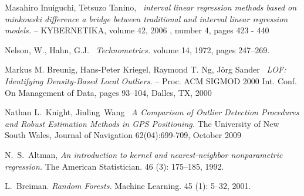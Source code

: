 \documentclass[a4paper,14pt]{extarticle}
\begin{document}
\begin{thebibliography}{8}
    Masahiro Inuiguchi, Tetsuzo Tanino,~
    \textit{interval linear regression methods based on minkowski difference a bridge between traditional and interval linear regression models.} --
    KYBERNETIKA, volume 42, 2006 , number 4, pages 423 - 440

     Nelson, W., Hahn, G.J.~
    \textit{Technometrics.} 
    volume 14, 1972, pages 247–269.

    Markus M. Breunig, Hans-Peter Kriegel, Raymond T. Ng, Jörg Sander~
    \textit{LOF: Identifying Density-Based Local Outliers.}
   -- Proc. ACM SIGMOD 2000 Int. Conf. On Management of Data, pages 93--104, Dalles, TX, 2000

   Nathan L.~Knight, Jinling~Wang~
   \textit{A Comparison of Outlier Detection Procedures and Robust Estimation Methods in GPS Positioning.}
   The University of New South Wales, Journal of Navigation 62(04):699-709, October 2009

   N.~S.~Altman,
   \textit{An introduction to kernel and nearest-neighbor nonparametric regression.}
   The American Statistician. 46 (3): 175–185, 1992.

   L.~Breiman. 
   \textit{Random Forests.} 
   Machine Learning. 45 (1): 5–32, 2001. 

\end{thebibliography}
\newpage


\end{document}
